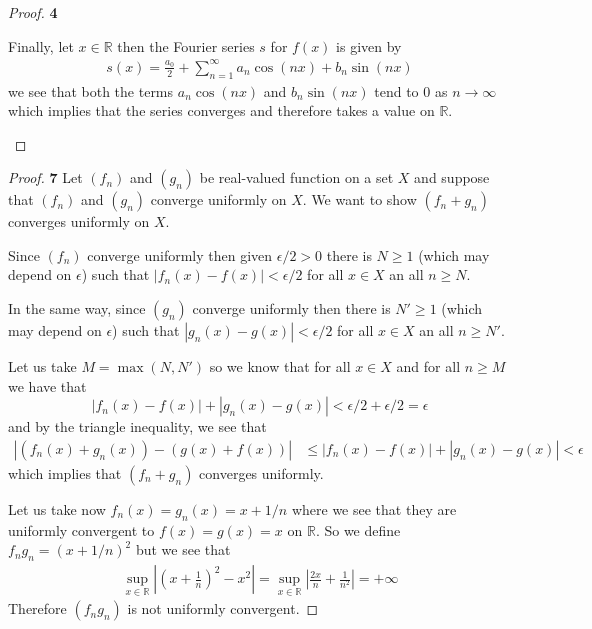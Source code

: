 \documentclass[11pt]{article}
\newcommand{\R}{\mathbb{R}}
\theoremstyle{definition}
\begin{document}
\begin{proof}{\textbf{4}}
\begin{itemize}
    Finally, let $x \in \R$ then the Fourier series $s$ for $f(x)$ is given by
    \begin{align*}
        s(x) = \frac{a_0}{2} + \sum_{n=1}^\infty a_n\cos(nx) + b_n\sin(nx)
    \end{align*}
    we see that both the terms $a_n\cos(nx)$ and $b_n\sin(nx)$ tend to 0 as
    $n \to \infty$ which implies that the series converges and therefore
    takes a value on $\R$.
\end{itemize}
\end{proof}
\cleardoublepage
\begin{proof}{\textbf{7}}
    Let $(f_n)$ and $(g_n)$ be real-valued function on a set $X$ and suppose
    that $(f_n)$ and $(g_n)$ converge uniformly on $X$. We want to show
    $(f_n + g_n)$ converges uniformly on $X$.

    Since $(f_n)$ converge uniformly then given $\epsilon/2 > 0$
    there is $N \geq 1$ (which may depend on $\epsilon$)
    such that $|f_n(x) - f(x)| < \epsilon/2$ for all $x \in X$ an all $n \geq N$.

    In the same way, since $(g_n)$ converge uniformly then
    there is $N' \geq 1$ (which may depend on $\epsilon$)
    such that $|g_n(x) - g(x)| < \epsilon/2$ for all $x \in X$ an all $n \geq N'$.
 
    Let us take $M = \max(N, N')$ so we know that for all $x \in X$ and
    for all $n \geq M$ we have that
    $$|f_n(x) -f(x)| + |g_n(x) -g(x)| < \epsilon/2 + \epsilon/2 = \epsilon$$
    and by the triangle inequality, we see that
    \begin{align*}
        |(f_n(x) + g_n(x)) - (g(x) + f(x))| &\leq |f_n(x) -f(x)| + |g_n(x) -g(x)|
        < \epsilon
    \end{align*}
    which implies that $(f_n + g_n)$ converges uniformly.

    Let us take now $f_n(x) = g_n(x) = x + 1/n$ where we see that they are
    uniformly convergent to $f(x) = g(x) = x$ on $\R$.
    So we define $f_ng_n = (x + 1/n)^2$ but we see that
    \begin{align*}
        \sup_{x \in \R}\left|\left(x + \frac{1}{n}\right)^2 - x^2\right|
        = \sup_{x \in \R}\left|\frac{2x}{n} + \frac{1}{n^2}\right| = +\infty
    \end{align*}
    Therefore $(f_ng_n)$ is not uniformly convergent.
\end{proof}
\cleardoublepage
\end{document}
